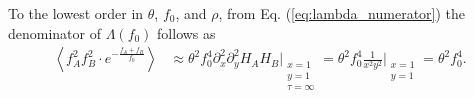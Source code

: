\documentclass[11pt]{article}
\begin{document}



To the lowest order in $\theta$, $f_0$, and $\rho$, from Eq. (\ref{eq:lambda_numerator}) the denominator of $\Lambda(f_0)$ follows as 
\begin{align}
    \left\langle f_A^2f_B^2\cdot e^{-\frac{f_{A}+f_{B}}{f_0}}\right\rangle &\approx \theta^2 f_0^4 \partial_x^2 \partial_y^2 H_A H_B \Bigg\vert_{\substack{x=1 \\ y=1 \\ \tau=\infty}} = \theta^2 f_0^4 \frac{1}{x^2y^2}\Bigg\vert_{\substack{x=1 \\ y=1}} = \theta^2 f_0^4.
\end{align}
\end{document}
